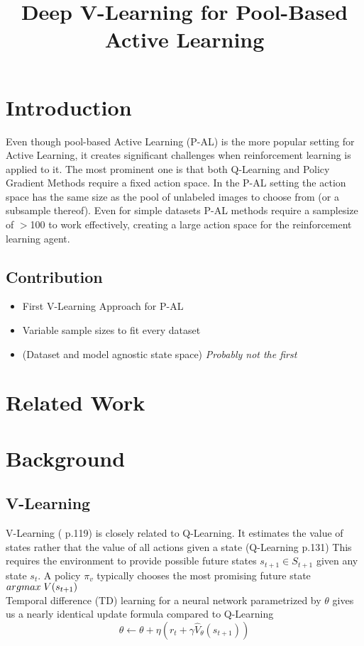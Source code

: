 \documentclass[]{article}
\title{Deep V-Learning for Pool-Based Active Learning}
\begin{document}
\maketitle

\section{Introduction}
Even though pool-based Active Learning (P-AL) is the more popular setting for Active Learning, it creates significant challenges when reinforcement learning is applied to it.
The most prominent one is that both Q-Learning and Policy Gradient Methods require a fixed action space. 
In the P-AL setting the action space has the same size as the pool of unlabeled images to choose from (or a subsample thereof).
Even for simple datasets P-AL methods require a samplesize of $>$100 to work effectively, creating a large action space for the reinforcement learning agent. \\

\subsection{Contribution}
\begin{itemize}
	\item First V-Learning Approach for P-AL
	\item Variable sample sizes to fit every dataset
	\item (Dataset and model agnostic state space) \textit{Probably not the first}
\end{itemize}

\section{Related Work}

\section{Background}
\subsection{V-Learning}
V-Learning (\cite{rl_intro} p.119) is closely related to Q-Learning. It estimates the value of states rather that the value of all actions given a state (Q-Learning \cite{rl_intro} p.131) 
This requires the environment to provide possible future states $s_{t+1} \in S_{t+1}$ given any state $s_t$.
A policy $\pi_v$ typically chooses the most promising future state $argmax \hspace{1mm} V(s_{t+1})$ \\
Temporal difference (TD) learning for a neural network parametrized by $\theta$ gives us a nearly identical update formula compared to Q-Learning
\begin{equation}
	\theta \leftarrow \theta + \eta \left( r_t + \gamma \hat V_\theta(s_{t+1}) \right)
\end{equation} 
\end{document}
